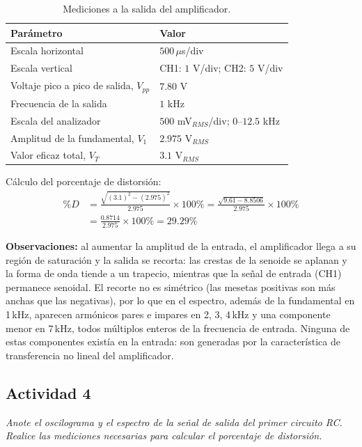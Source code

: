 \documentclass[12pt]{article}
\begin{document}
\begin{table}[H]
\centering
\begin{tabular}{|l|l|}
\hline
\textbf{Parámetro} & \textbf{Valor} \\ \hline
Escala horizontal & $500\,\mu$s/div \\ \hline
Escala vertical & CH1: $1$ V/div;\; CH2: $5$ V/div \\ \hline
Voltaje pico a pico de salida, $V_{pp}$ & $7.80$ V \\ \hline
Frecuencia de la salida & $1$ kHz \\ \hline
Escala del analizador & $500$ mV$_{RMS}$/div;\; $0$--$12.5$ kHz \\ \hline
Amplitud de la fundamental, $V_1$ & $2.975$ V$_{RMS}$ \\ \hline
Valor eficaz total, $V_T$ & $3.1$ V$_{RMS}$ \\ \hline
\end{tabular}
\caption{Mediciones a la salida del amplificador.}
\end{table}

Cálculo del porcentaje de distorsión:
\[
\begin{aligned}
\%D &= \frac{\sqrt{(3.1)^2 - (2.975)^2}}{2.975}\times 100\%
     = \frac{\sqrt{9.61 - 8.8506}}{2.975}\times 100\%\\
    &= \frac{0.8714}{2.975}\times 100\% = 29.29\%
\end{aligned}
\]

\textbf{Observaciones:} al aumentar la amplitud de la entrada, el amplificador llega a su región de saturación y la salida se recorta: las crestas de la senoide se aplanan y la forma de onda tiende a un trapecio, mientras que la señal de entrada (CH1) permanece senoidal. El recorte no es simétrico (las mesetas positivas son más anchas que las negativas), por lo que en el espectro, además de la fundamental en 1\,kHz, aparecen armónicos pares e impares en 2, 3, 4\,kHz y una componente menor en 7\,kHz, todos múltiplos enteros de la frecuencia de entrada. Ninguna de estas componentes existía en la entrada: son generadas por la característica de transferencia no lineal del amplificador.

\subsection{Actividad 4}

\textit{Anote el oscilograma y el espectro de la señal de salida del primer circuito RC. Realice las mediciones necesarias para calcular el porcentaje de distorsión.}
\end{document}
